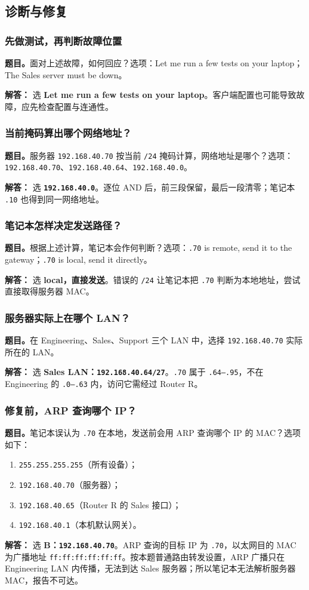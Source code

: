 \documentclass[11pt,a4paper,fontset=fandol]{ctexart}
\renewcommand{\exercisequestion}[2]{%
  \Needspace{5\baselineskip}%
  \subsubsection{#2}\label{exercise:#1}%
}
\renewenvironment{checkedsolution}
  {\par\nopagebreak[4]\textbf{解答：}\ignorespaces}
  {\par}
\begin{document}
\subsection{诊断与修复}

\exercisequestion{SC2008-HW02-Q01}{先做测试，再判断故障位置}
\textbf{题目。}面对上述故障，如何回应？选项：Let me run a few tests on your laptop；The Sales server must be down。
\begin{checkedsolution}
选 \textbf{Let me run a few tests on your laptop}。客户端配置也可能导致故障，应先检查配置与连通性。
\end{checkedsolution}

\exercisequestion{SC2008-HW02-Q02}{当前掩码算出哪个网络地址？}
\textbf{题目。}服务器 \texttt{192.168.40.70} 按当前 \texttt{/24} 掩码计算，网络地址是哪个？选项：\texttt{192.168.40.70}、\texttt{192.168.40.64}、\texttt{192.168.40.0}。
\begin{checkedsolution}
选 \textbf{\texttt{192.168.40.0}}。逐位 AND 后，前三段保留，最后一段清零；笔记本 \texttt{.10} 也得到同一网络地址。
\end{checkedsolution}

\exercisequestion{SC2008-HW02-Q03}{笔记本怎样决定发送路径？}
\textbf{题目。}根据上述计算，笔记本会作何判断？选项：\texttt{.70} is remote, send it to the gateway；\texttt{.70} is local, send it directly。
\begin{checkedsolution}
选 \textbf{local，直接发送}。错误的 \texttt{/24} 让笔记本把 \texttt{.70} 判断为本地地址，尝试直接取得服务器 MAC。
\end{checkedsolution}

\exercisequestion{SC2008-HW02-Q04}{服务器实际上在哪个 LAN？}
\textbf{题目。}在 Engineering、Sales、Support 三个 LAN 中，选择 \texttt{192.168.40.70} 实际所在的 LAN。
\begin{checkedsolution}
选 \textbf{Sales LAN：\texttt{192.168.40.64/27}}。\texttt{.70} 属于 \texttt{.64--.95}，不在 Engineering 的 \texttt{.0--.63} 内，访问它需经过 Router R。
\end{checkedsolution}

\exercisequestion{SC2008-HW02-Q05}{修复前，ARP 查询哪个 IP？}
\textbf{题目。}笔记本误认为 \texttt{.70} 在本地，发送前会用 ARP 查询哪个 IP 的 MAC？选项如下：
\begin{enumerate}[label=\Alph*.,leftmargin=2.4em]
  \item \texttt{255.255.255.255}（所有设备）；
  \item \texttt{192.168.40.70}（服务器）；
  \item \texttt{192.168.40.65}（Router R 的 Sales 接口）；
  \item \texttt{192.168.40.1}（本机默认网关）。
\end{enumerate}
\begin{checkedsolution}
选 \textbf{B：\texttt{192.168.40.70}}。ARP 查询的目标 IP 为 \texttt{.70}，以太网目的 MAC 为广播地址 \texttt{ff:ff:ff:ff:ff:ff}。按本题普通路由转发设置，ARP 广播只在 Engineering LAN 内传播，无法到达 Sales 服务器；所以笔记本无法解析服务器 MAC，报告不可达。
\end{checkedsolution}
\end{document}
